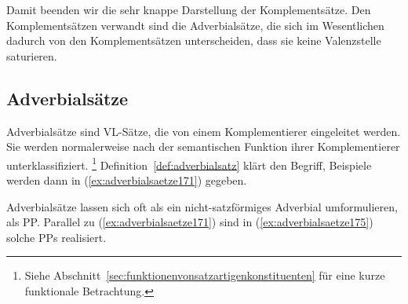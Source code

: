Damit beenden wir die sehr knappe Darstellung der Komplementsätze.
Den Komplementsätzen verwandt sind die Adverbialsätze, die sich im Wesentlichen dadurch von den Komplementsätzen unterscheiden, dass sie keine Valenzstelle saturieren.

\Stretch
\Enl[-1]

\subsection{Adverbialsätze}
\label{sec:adverbialsaetze}


Adverbialsätze sind VL-Sätze, die von einem Komplementierer eingeleitet werden.
Sie werden normalerweise nach der semantischen Funktion ihrer Komplementierer unterklassifiziert.%
\footnote{Siehe Abschnitt~\ref{sec:funktionenvonsatzartigenkonstituenten} für eine kurze funktionale Betrachtung.}
Definition~\ref{def:adverbialsatz} klärt den Begriff, Beispiele werden dann in (\ref{ex:adverbialsaetze171}) gegeben.


\begin{exe}
  \ex\label{ex:adverbialsaetze171}
  \begin{xlist}
  \end{xlist}
\end{exe}

Adverbialsätze lassen sich oft als ein nicht-satzförmiges Adverbial umformulieren, \zB als PP.
Parallel zu (\ref{ex:adverbialsaetze171}) sind in (\ref{ex:adverbialsaetze175}) solche PPs realisiert.

\begin{exe}
  \ex\label{ex:adverbialsaetze175}
  \begin{xlist}
  \end{xlist}
\end{exe}

